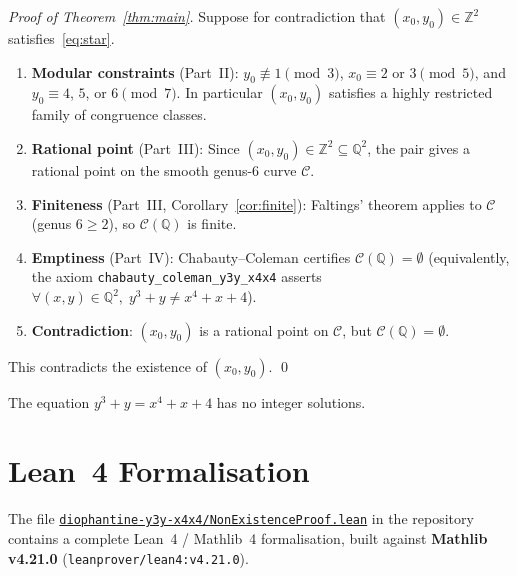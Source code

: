 \documentclass[12pt, a4paper]{article}
\theoremstyle{definition}
\newcommand{\Z}{\mathbb{Z}}
\newcommand{\Q}{\mathbb{Q}}
\begin{document}
\begin{proof}[Proof of Theorem~\ref{thm:main}]
  Suppose for contradiction that $(x_0, y_0) \in \Z^2$ satisfies~\eqref{eq:star}.
  \begin{enumerate}[label=\textbf{Step \arabic*.}, leftmargin=*, noitemsep]
    \item \textbf{Modular constraints} (Part~II): $y_0 \not\equiv 1 \pmod 3$,
          $x_0 \equiv 2$ or $3 \pmod 5$, and $y_0 \equiv 4$, $5$, or $6 \pmod 7$.
          In particular $(x_0,y_0)$ satisfies a highly restricted
          family of congruence classes.

    \item \textbf{Rational point} (Part~III): Since $(x_0,y_0) \in \Z^2 \subseteq \Q^2$,
          the pair gives a rational point on the smooth genus-6 curve $\mathcal{C}$.

    \item \textbf{Finiteness} (Part~III, Corollary~\ref{cor:finite}): Faltings'
          theorem applies to $\mathcal{C}$ (genus $6 \geq 2$), so $\mathcal{C}(\Q)$
          is finite.

    \item \textbf{Emptiness} (Part~IV): Chabauty--Coleman certifies
          $\mathcal{C}(\Q) = \emptyset$ (equivalently, the axiom
          \texttt{chabauty\_coleman\_y3y\_x4x4} asserts $\forall (x,y) \in \Q^2,\;
          y^3+y \neq x^4+x+4$).

    \item \textbf{Contradiction}: $(x_0, y_0)$ is a rational point on
          $\mathcal{C}$, but $\mathcal{C}(\Q) = \emptyset$.
  \end{enumerate}
  This contradicts the existence of $(x_0, y_0)$. \qed
\end{proof}

\begin{theorem*}[Restated]
  The equation $y^3 + y = x^4 + x + 4$ has no integer solutions.
\end{theorem*}

\section{Lean~4 Formalisation}\label{sec:lean}

The file
\href{https://github.com/JAgbanwa/miscellaneousmathproblems/blob/main/diophantine-y3y-x4x4/NonExistenceProof.lean}%
  {\texttt{diophantine-y3y-x4x4/NonExistenceProof.lean}}
in the repository contains a complete Lean~4 / Mathlib~4 formalisation, built
against \textbf{Mathlib v4.21.0} (\texttt{leanprover/lean4:v4.21.0}).
\end{document}
